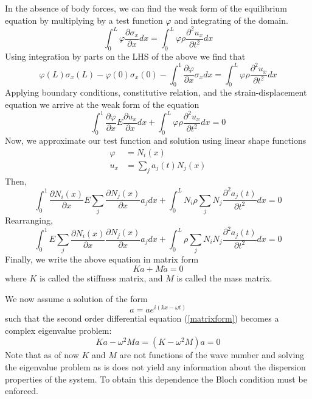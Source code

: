 \documentclass{article}
\begin{document}
In the absence of body forces, we can find the weak form of the equilibrium 
equation by multiplying by a test function $\varphi$ and integrating of the 
domain.
\begin{equation}
\int_0^L \varphi \frac{\partial \sigma_x}{\partial x} dx
= \int_0^L \varphi \rho \frac{\partial^2 u_x}{\partial t^2} dx
\end{equation}
Using integration by parts on the LHS of the above we find that
\begin{equation}
\varphi(L)\sigma_x(L) - \varphi(0)\sigma_x(0) 
- \int_0^1 \frac{\partial \varphi}{\partial x} \sigma_x dx
= \int_0^L \varphi \rho \frac{\partial^2 u_x}{\partial t^2} dx
\end{equation}
Applying boundary conditions, constitutive relation, and the 
strain-displacement equation we arrive at the weak form of the equation
\begin{equation}
\int_0^1 \frac{\partial \varphi}{\partial x} E \frac{\partial u_x}{\partial x} 
dx
+ \int_0^L \varphi \rho \frac{\partial^2 u_x}{\partial t^2} dx = 0
\end{equation}
Now, we approximate our test function and solution using linear shape functions
\begin{align}
\varphi &= N_i(x) \\
u_x &= \sum_j a_j(t)N_j(x)
\end{align}
Then,
\begin{equation}
\int_0^1 \frac{\partial N_i(x)}{\partial x} E \sum_j\frac{\partial 
N_j(x)}{\partial x} a_j dx
+ \int_0^L N_i \rho \sum_j N_j \frac{\partial^2 a_j(t)}{\partial t^2} dx = 0
\end{equation}
Rearranging,
\begin{equation}
\int_0^1  E \sum_j\frac{\partial N_i(x)}{\partial x}\frac{\partial 
N_j(x)}{\partial x} a_j dx
+ \int_0^L \rho \sum_j  N_i N_j \frac{\partial^2 a_j(t)}{\partial t^2} dx = 0
\end{equation}
Finally, we write the above equation in matrix form
\begin{equation} \label{matrixform}
Ka+M\ddot{a} = 0 
\end{equation}
where $K$ is called the stiffness matrix, and $M$ is called the mass matrix. 

We now assume a solution of the form
\begin{equation}
a = ae^{i(kx-\omega t)}
\end{equation}
such that the second order differential equation (\ref{matrixform}) becomes a 
complex eigenvalue problem:
\begin{equation}
Ka - \omega^2 Ma = (K-\omega^2M)a = 0
\end{equation}
Note that as of now $K$ and $M$ are not functions of the wave number and 
solving the eigenvalue problem as is does not yield any information about the 
dispersion properties of the system. To obtain this dependence the Bloch 
condition must be enforced. 
\end{document}
